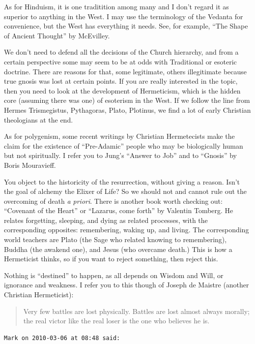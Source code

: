 \begin{footnotesize}
\begin{sffamily}
As for Hinduism, it is one traditition among many and I don't regard it as superior to anything in the West. I may use the terminology of the Vedanta for convenience, but the West has everything it needs. See, for example, ``The Shape of Ancient Thought'' by McEvilley.

We don't need to defend all the decisions of the Church hierarchy, and from a certain perspective some may seem to be at odds with Traditional or esoteric doctrine. There are reasons for that, some legitimate, others illegitimate because true gnosis was lost at certain points. If you are really interested in the topic, then you need to look at the development of Hermeticism, which is the hidden core (assuming there was one) of esoterism in the West. If we follow the line from Hermes Trismegistus, Pythagoras, Plato, Plotinus, we find a lot of early Christian theologians at the end.

As for polygenism, some recent writings by Christian Hermetecists make the claim for the existence of ``Pre-Adamic'' people who may be biologically human but not spiritually. I refer you to Jung's ``Answer to Job'' and to ``Gnosis'' by Boris Mouravieff.

You object to the historicity of the resurrection, without giving a reason. Isn't the goal of alchemy the Elixer of Life? So we should not and cannot rule out the overcoming of death \emph{a priori}. There is another book worth checking out: ``Covenant of the Heart'' or ``Lazarus, come forth'' by Valentin Tomberg. He relates forgetting, sleeping, and dying as related processes, with the corresponding opposites: remembering, waking up, and living. The corresponding world teachers are Plato (the Sage who related knowing to remembering), Buddha (the awakend one), and Jesus (who overcame death.) This is how a Hermeticist thinks, so if you want to reject something, then reject this.

Nothing is ``destined'' to happen, as all depends on Wisdom and Will, or ignorance and weakness. I refer you to this though of Joseph de Maistre (another Christian Hermeticist):

\begin{quote}\footnotesize
Very few battles are lost physically. Battles are lost almost always morally; the real victor like the real loser is the one who believes he is.
\end{quote}


\hfill

\texttt{Mark on 2010-03-06 at 08:48 said:}


\end{sffamily}
\end{footnotesize}
